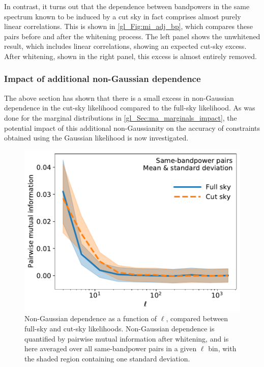 In contrast, it turns out that the dependence between bandpowers in the same spectrum known to be induced by a cut sky in fact comprises almost purely linear correlations. This is shown in \autoref{gl_Fig:mi_adj_bp}, which compares these pairs before and after the whitening process. The left panel shows the unwhitened result, which includes linear correlations, showing an expected cut-sky excess. After whitening, shown in the right panel, this excess is almost entirely removed.

\subsubsection{Impact of additional non-Gaussian dependence}

The above section has shown that there is a small excess in non-Gaussian dependence in the cut-sky likelihood compared to the full-sky likelihood. As was done for the marginal distributions in \autoref{gl_Sec:ma_marginals_impact}, the potential impact of this additional non-Gaussianity on the accuracy of constraints obtained using the Gaussian likelihood is now investigated.

\begin{figure}
\centering
\includegraphics[width=.5\textwidth]{mi_vs_l}
\caption{Non-Gaussian dependence as a function of $\ell$, compared between full-sky and cut-sky likelihoods. Non-Gaussian dependence is quantified by pairwise mutual information after whitening, and is here averaged over all same-bandpower pairs in a given $\ell$ bin, with the shaded region containing one standard deviation.}
\label{gl_Fig:mi_vs_l}
\end{figure}

